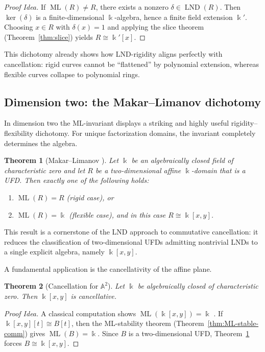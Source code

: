 \documentclass{amsart}
\theoremstyle{plain}
\newtheorem{theorem}{Theorem}
\numberwithin{theorem}{section}
\numberwithin{equation}{theorem}
\theoremstyle{definition}
\DeclareMathOperator{\LND}{LND}
\DeclareMathOperator{\ML}{ML}
\begin{document}
\begin{proof}[Proof Idea]
If $\ML(R)\neq R$, there exists a nonzero $\delta\in\LND(R)$.  
Then $\ker(\delta)$ is a finite-dimensional $\Bbbk$-algebra, hence a finite field
extension $\Bbbk'$.  Choosing $x\in R$ with $\delta(x)=1$ and applying the slice
theorem (Theorem~\ref{thm:slice}) yields $R\cong\Bbbk'[x]$.
\end{proof}

This dichotomy already shows how LND-rigidity aligns perfectly with cancellation:
rigid curves cannot be ``flattened'' by polynomial extension, whereas flexible
curves collapse to polynomial rings.

\subsection{Dimension two: the Makar--Limanov dichotomy}

In dimension two the ML-invariant displays a striking and highly useful
rigidity--flexibility dichotomy.  For unique factorization domains, the invariant
completely determines the algebra.

\begin{theorem}[Makar--Limanov \cite{MakarLimanov1996}]
\label{thm:surface-dichotomy}
Let $\Bbbk$ be an algebraically closed field of characteristic zero and let
$R$ be a two-dimensional affine $\Bbbk$-domain that is a UFD.  
Then exactly one of the following holds:
\begin{enumerate}
    \item $\ML(R)=R$ \textup{(rigid case)}, or
    \item $\ML(R)=\Bbbk$ \textup{(flexible case)}, and in this case 
          $R\cong \Bbbk[x,y]$.
\end{enumerate}
\end{theorem}

This result is a cornerstone of the LND approach to commutative cancellation: it
reduces the classification of two-dimensional UFDs admitting nontrivial LNDs to a
single explicit algebra, namely $\Bbbk[x,y]$.

A fundamental application is the cancellativity of the affine plane.

\begin{theorem}[Cancellation for $\mathbb{A}^2$]
\label{thm:A2-cancel}
Let $\Bbbk$ be algebraically closed of characteristic zero.  
Then $\Bbbk[x,y]$ is cancellative.
\end{theorem}

\begin{proof}[Proof Idea]
A classical computation shows $\ML(\Bbbk[x,y])=\Bbbk$ 
\cite{ML, Crachiola2009}.  
If $\Bbbk[x,y][t]\cong B[t]$, then the ML-stability theorem
(Theorem~\ref{thm:ML-stable-comm}) gives $\ML(B)=\Bbbk$.  
Since $B$ is a two-dimensional UFD, 
Theorem~\ref{thm:surface-dichotomy} forces $B\cong\Bbbk[x,y]$.
\end{proof}
\end{document}
